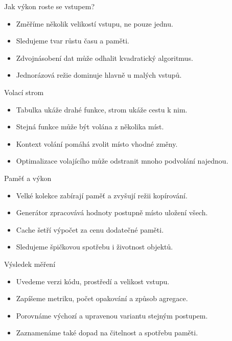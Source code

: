 \documentclass[aspectratio=169]{beamer}
\begin{document}
\begin{frame}{Jak výkon roste se vstupem?}
\begin{itemize}
\item Změříme několik velikostí vstupu, ne pouze jednu.
\item Sledujeme tvar růstu času a paměti.
\item Zdvojnásobení dat může odhalit kvadratický algoritmus.
\item Jednorázová režie dominuje hlavně u malých vstupů.
\end{itemize}
\end{frame}

\begin{frame}{Volací strom}
\begin{itemize}
\item Tabulka ukáže drahé funkce, strom ukáže cestu k nim.
\item Stejná funkce může být volána z několika míst.
\item Kontext volání pomáhá zvolit místo vhodné změny.
\item Optimalizace volajícího může odstranit mnoho podvolání najednou.
\end{itemize}
\end{frame}

\begin{frame}{Paměť a výkon}
\begin{itemize}
\item Velké kolekce zabírají paměť a zvyšují režii kopírování.
\item Generátor zpracovává hodnoty postupně místo uložení všech.
\item Cache šetří výpočet za cenu dodatečné paměti.
\item Sledujeme špičkovou spotřebu i životnost objektů.
\end{itemize}
\end{frame}

\begin{frame}{Výsledek měření}
\begin{itemize}
\item Uvedeme verzi kódu, prostředí a velikost vstupu.
\item Zapíšeme metriku, počet opakování a způsob agregace.
\item Porovnáme výchozí a upravenou variantu stejným postupem.
\item Zaznamenáme také dopad na čitelnost a spotřebu paměti.
\end{itemize}
\end{frame}
\end{document}
